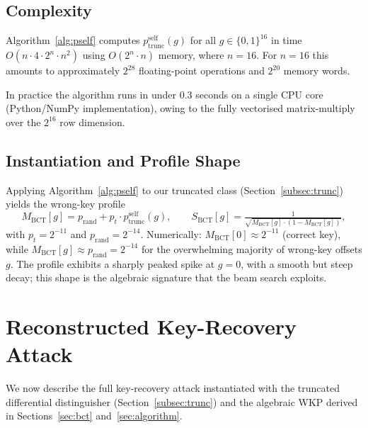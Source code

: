 \documentclass[runningheads]{llncs}
\newcommand{\pself}{p^{\mathrm{self}}_{\mathrm{trunc}}}
\begin{document}
\subsection{Complexity}

\begin{proposition}
  \label{prop:complexity}
  Algorithm~\ref{alg:pself} computes $\pself(g)$ for all $g \in
  \{0,1\}^{16}$ in time $O(n \cdot 4 \cdot 2^n \cdot n^2)$ using
  $O(2^n \cdot n)$ memory, where $n = 16$.  For $n = 16$ this amounts
  to approximately $2^{28}$ floating-point operations and $2^{20}$
  memory words.
\end{proposition}

In practice the algorithm runs in under 0.3 seconds on a single CPU
core (Python/NumPy implementation), owing to the fully vectorised
matrix-multiply over the $2^{16}$ row dimension.

\subsection{Instantiation and Profile Shape}
\label{subsec:profile}

Applying Algorithm~\ref{alg:pself} to our truncated class
(Section~\ref{subsec:trunc}) yields the wrong-key profile
\[
  M_{\mathrm{BCT}}[g] = p_{\mathrm{rand}} + p_t \cdot \pself(g),
  \qquad
  S_{\mathrm{BCT}}[g] = \tfrac{1}{\sqrt{M_{\mathrm{BCT}}[g]
                         \cdot (1 - M_{\mathrm{BCT}}[g])}},
\]
with $p_t = 2^{-11}$ and $p_{\mathrm{rand}} = 2^{-14}$.  Numerically:
$M_{\mathrm{BCT}}[0] \approx 2^{-11}$ (correct key), while
$M_{\mathrm{BCT}}[g] \approx p_{\mathrm{rand}} = 2^{-14}$ for
the overwhelming majority of wrong-key offsets $g$.  The profile
exhibits a sharply peaked spike at $g = 0$, with a smooth but steep
decay; this shape is the algebraic signature that the beam search
exploits.

\section{Reconstructed Key-Recovery Attack}
\label{sec:attack}

We now describe the full key-recovery attack instantiated with the
truncated differential distinguisher (Section~\ref{subsec:trunc})
and the algebraic WKP derived in Sections~\ref{sec:bct}
and~\ref{sec:algorithm}.
\end{document}
